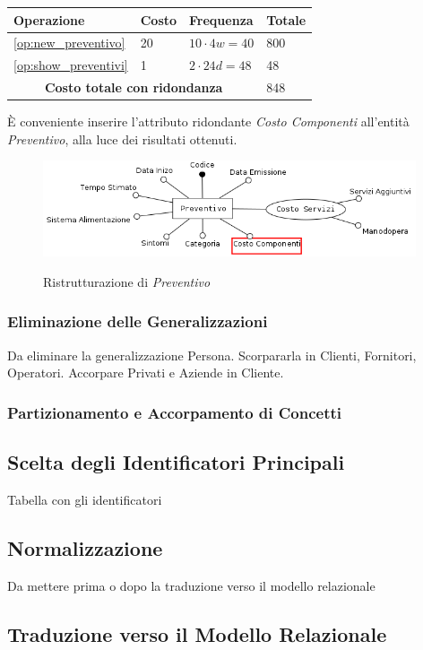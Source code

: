 					\begin{tabular}{| p{3cm} | p{3cm} | p{3cm} | p{3cm} |}
						\hline
						\textbf{Operazione} & \textbf{Costo} & \textbf{Frequenza} & \textbf{Totale} \\ \hline
						\ref{op:new_preventivo}		& 20 	& $10 \cdot 4w = 40$	& 800	\\
						\ref{op:show_preventivi} 	& 1 	& $2 \cdot 24d = 48$	& 48	\\
						\hline
						\multicolumn{3}{|c|}{\textbf{Costo totale con ridondanza}} & 848 \\
						\hline
					\end{tabular}
					\vspace{2ex}

					È conveniente inserire l'attributo ridondante \emph{Costo Componenti} all'entità \emph{Preventivo}, alla luce dei risultati ottenuti.

					\begin{figure}[H]
						\includegraphics[width=11cm]{images/refactor/preventivo.png}
						\centering
						\label{fig:preventivo_refactor}
						\caption{Ristrutturazione di \emph{Preventivo}}
					\end{figure}

		\subsubsection{Eliminazione delle Generalizzazioni}
			
			Da eliminare la generalizzazione Persona. Scorpararla in Clienti, Fornitori, Operatori. Accorpare Privati e Aziende in Cliente.
			
		\subsubsection{Partizionamento e Accorpamento di Concetti}
	\subsection{Scelta degli Identificatori Principali}
		
		Tabella con gli identificatori
		
	\subsection{Normalizzazione}
		Da mettere prima o dopo la traduzione verso il modello relazionale
	\subsection{Traduzione verso il Modello Relazionale}
